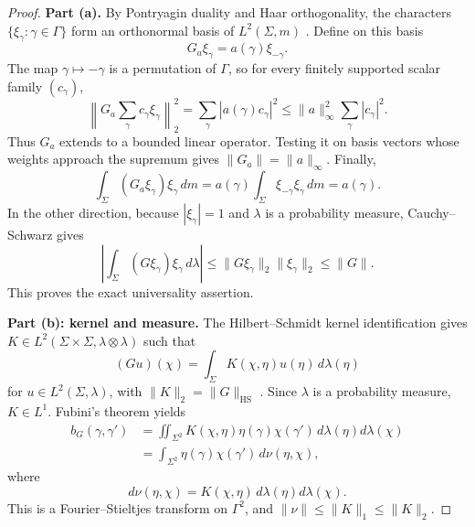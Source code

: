 \documentclass[11pt]{article}
\newcommand{\HS}{\mathrm{HS}}
\begin{document}
\begin{proof}
\textbf{Part (a).}
By Pontryagin duality and Haar orthogonality, the characters
$\{\xi_\gamma:\gamma\in\Gamma\}$ form an orthonormal basis of
$L^2(\Sigma,m)$ \cite[Chapter 1]{Rudin1962}.  Define on this basis
\[
 G_a\xi_\gamma=a(\gamma)\xi_{-\gamma}.
\]
The map $\gamma\mapsto-\gamma$ is a permutation of $\Gamma$, so for every
finitely supported scalar family $(c_\gamma)$,
\[
 \left\|G_a\sum_\gamma c_\gamma\xi_\gamma\right\|_2^2
 =\sum_\gamma |a(\gamma)c_\gamma|^2
 \leq\|a\|_\infty^2\sum_\gamma|c_\gamma|^2.
\]
Thus $G_a$ extends to a bounded linear operator.  Testing it on basis vectors
whose weights approach the supremum gives $\|G_a\|=\|a\|_\infty$.  Finally,
\[
 \int_\Sigma(G_a\xi_\gamma)\xi_\gamma\,dm
 =a(\gamma)\int_\Sigma\xi_{-\gamma}\xi_\gamma\,dm
 =a(\gamma).
\]
In the other direction, because $|\xi_\gamma|=1$ and $\lambda$ is a
probability measure, Cauchy--Schwarz gives
\[
 \left|\int_\Sigma(G\xi_\gamma)\xi_\gamma\,d\lambda\right|
 \leq \|G\xi_\gamma\|_2\|\xi_\gamma\|_2\leq\|G\|.
\]
This proves the exact universality assertion.

\medskip
\noindent\textbf{Part (b): kernel and measure.}
The Hilbert--Schmidt kernel identification gives
$K\in L^2(\Sigma\times\Sigma,\lambda\otimes\lambda)$ such that
\[
 (Gu)(\chi)=\int_\Sigma K(\chi,\eta)u(\eta)\,d\lambda(\eta)
\]
for $u\in L^2(\Sigma,\lambda)$, with
$\|K\|_2=\|G\|_{\HS}$ \cite[Chapter 2]{Simon2005}.  Since $\lambda$ is a
probability measure, $K\in L^1$.  Fubini's theorem yields
\begin{align*}
 b_G(\gamma,\gamma')
 &=\iint_{\Sigma^2}K(\chi,\eta)\eta(\gamma)\chi(\gamma')
       \,d\lambda(\eta)d\lambda(\chi)\\
 &=\int_{\Sigma^2}\eta(\gamma)\chi(\gamma')\,d\nu(\eta,\chi),
\end{align*}
where
\[
 d\nu(\eta,\chi)=K(\chi,\eta)\,d\lambda(\eta)d\lambda(\chi).
\]
This is a Fourier--Stieltjes transform on $\Gamma^2$, and
$\|\nu\|\leq\|K\|_1\leq\|K\|_2$.


\end{proof}
\end{document}
